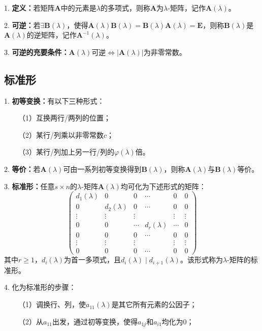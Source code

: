 1. \textbf{定义：}若矩阵$\boldsymbol{A}$中的元素是$\lambda$的多项式，则称$\boldsymbol{A}$为$\lambda$-矩阵，记作$\boldsymbol{A}(\lambda)$。

2. \textbf{可逆：}若$\exists \boldsymbol{B}(\lambda)$，使得$\boldsymbol{A}(\lambda)\boldsymbol{B}(\lambda)=\boldsymbol{B}(\lambda)\boldsymbol{A}(\lambda)=\boldsymbol{E}$，则称$\boldsymbol{B}(\lambda)$是$\boldsymbol{A}(\lambda)$的逆矩阵，记作$\boldsymbol{A}^{-1}(\lambda)$。

3. \textbf{可逆的充要条件：}$\boldsymbol{A}(\lambda)$可逆$\Leftrightarrow |\boldsymbol{A}(\lambda)|$为非零常数。

\subsection{标准形}

1. \textbf{初等变换：}有以下三种形式：

~~~~（1）互换两行/两列的位置；

~~~~（2）某行/列乘以非零常数$c$；

~~~~（3）某行/列加上另一行/列的$\varphi(\lambda)$倍。

2. \textbf{等价：}若$\boldsymbol{A}(\lambda)$可由一系列初等变换得到$\boldsymbol{B}(\lambda)$，则称$\boldsymbol{A}(\lambda)$与$\boldsymbol{B}(\lambda)$等价。

3. \textbf{标准形：}任意$s\times n$的$\lambda$-矩阵$\boldsymbol{A}(\lambda)$均可化为下述形式的矩阵：
\begin{equation*}
    \begin{pmatrix}
        d_1(\lambda)&0&0&\cdots&0&0\\
        0&d_2(\lambda)&0&\cdots&0&0\\
        \vdots&\vdots&\vdots&&\vdots&\vdots\\
        0&0&\cdots&d_r(\lambda)&\cdots&0\\
        0&0&0&\cdots &0&0\\
       \vdots&\vdots&\vdots&&\vdots&\vdots\\
        0&0&0&\cdots&0&0
    \end{pmatrix}
\end{equation*}
其中$r\geqslant 1$，$d_i(\lambda)$为首一多项式，且$d_i(\lambda)\mid d_{i+1}(\lambda)$。该形式称为$\lambda$-矩阵的标准形。

4. 化为标准形的步骤：

~~~~（1）调换行、列，使$a_{11}(\lambda)$是其它所有元素的公因子；

~~~~（2）从$a_{11}$出发，通过初等变换，使得$a_{1j}$和$a_{i1}$均化为$0$；

